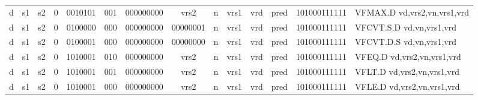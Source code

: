 \begin{landscape}
\begin{table}[p]
\begin{small}
\begin{center}
\begin{tabular}{p{0.08in}@{}p{0.08in}@{}p{0.08in}@{}p{0.08in}@{}p{0.50in}@{}p{0.30in}@{}p{0.08in}@{}p{0.8in}@{}p{0.48in}@{}p{0.32in}@{}p{0.08in}@{}p{0.8in}@{}p{0.8in}@{}p{0.4in}@{}p{0.56in}l}
\multicolumn{1}{|c|}{d} &
\multicolumn{1}{c|}{s1} &
\multicolumn{1}{c|}{s2} &
\multicolumn{1}{c|}{0} &
\multicolumn{1}{c|}{0010101} &
\multicolumn{1}{c|}{001} &
\multicolumn{2}{c|}{000000000} &
\multicolumn{2}{c|}{vrs2} &
\multicolumn{1}{c|}{n} &
\multicolumn{1}{c|}{vrs1} &
\multicolumn{1}{c|}{vrd} &
\multicolumn{1}{c|}{pred} &
\multicolumn{1}{c|}{101000111111} & VFMAX.D vd,vrs2,vn,vrs1,vrd \\
\cline{1-15}
  

\multicolumn{1}{|c|}{d} &
\multicolumn{1}{c|}{s1} &
\multicolumn{1}{c|}{s2} &
\multicolumn{1}{c|}{0} &
\multicolumn{1}{c|}{0100000} &
\multicolumn{1}{c|}{000} &
\multicolumn{2}{c|}{000000000} &
\multicolumn{2}{c|}{00000001} &
\multicolumn{1}{c|}{n} &
\multicolumn{1}{c|}{vrs1} &
\multicolumn{1}{c|}{vrd} &
\multicolumn{1}{c|}{pred} &
\multicolumn{1}{c|}{101000111111} & VFCVT.S.D vd,vn,vrs1,vrd \\
\cline{1-15}
  

\multicolumn{1}{|c|}{d} &
\multicolumn{1}{c|}{s1} &
\multicolumn{1}{c|}{s2} &
\multicolumn{1}{c|}{0} &
\multicolumn{1}{c|}{0100001} &
\multicolumn{1}{c|}{000} &
\multicolumn{2}{c|}{000000000} &
\multicolumn{2}{c|}{00000000} &
\multicolumn{1}{c|}{n} &
\multicolumn{1}{c|}{vrs1} &
\multicolumn{1}{c|}{vrd} &
\multicolumn{1}{c|}{pred} &
\multicolumn{1}{c|}{101000111111} & VFCVT.D.S vd,vn,vrs1,vrd \\
\cline{1-15}
  

\multicolumn{1}{|c|}{d} &
\multicolumn{1}{c|}{s1} &
\multicolumn{1}{c|}{s2} &
\multicolumn{1}{c|}{0} &
\multicolumn{1}{c|}{1010001} &
\multicolumn{1}{c|}{010} &
\multicolumn{2}{c|}{000000000} &
\multicolumn{2}{c|}{vrs2} &
\multicolumn{1}{c|}{n} &
\multicolumn{1}{c|}{vrs1} &
\multicolumn{1}{c|}{vrd} &
\multicolumn{1}{c|}{pred} &
\multicolumn{1}{c|}{101000111111} & VFEQ.D vd,vrs2,vn,vrs1,vrd \\
\cline{1-15}
  

\multicolumn{1}{|c|}{d} &
\multicolumn{1}{c|}{s1} &
\multicolumn{1}{c|}{s2} &
\multicolumn{1}{c|}{0} &
\multicolumn{1}{c|}{1010001} &
\multicolumn{1}{c|}{001} &
\multicolumn{2}{c|}{000000000} &
\multicolumn{2}{c|}{vrs2} &
\multicolumn{1}{c|}{n} &
\multicolumn{1}{c|}{vrs1} &
\multicolumn{1}{c|}{vrd} &
\multicolumn{1}{c|}{pred} &
\multicolumn{1}{c|}{101000111111} & VFLT.D vd,vrs2,vn,vrs1,vrd \\
\cline{1-15}
  

\multicolumn{1}{|c|}{d} &
\multicolumn{1}{c|}{s1} &
\multicolumn{1}{c|}{s2} &
\multicolumn{1}{c|}{0} &
\multicolumn{1}{c|}{1010001} &
\multicolumn{1}{c|}{000} &
\multicolumn{2}{c|}{000000000} &
\multicolumn{2}{c|}{vrs2} &
\multicolumn{1}{c|}{n} &
\multicolumn{1}{c|}{vrs1} &
\multicolumn{1}{c|}{vrd} &
\multicolumn{1}{c|}{pred} &
\multicolumn{1}{c|}{101000111111} & VFLE.D vd,vrs2,vn,vrs1,vrd \\
\cline{1-15}
  


\end{tabular}
\end{center}
\end{small}
\end{table}
\end{landscape}
